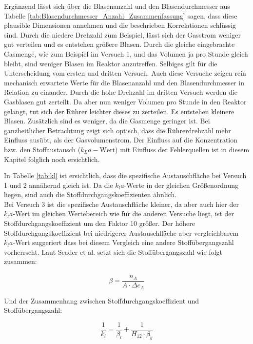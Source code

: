 \documentclass[12pt,liststotoc]{report}
\begin{document}
Ergänzend lässt sich über die Blasenanzahl und den Blasendurchmesser aus Tabelle \ref{tab:Blasendurchmesser_Anzahl_Zusammenfassung} sagen, dass diese plausible Dimensionen annehmen und die beschrieben Korrelationen schlüssig sind. Durch die niedere Drehzahl zum Beispiel, lässt sich der Gasstrom weniger gut verteilen und es entstehen größere Blasen. Durch die gleiche eingebrachte Gasmenge, wie zum Beispiel im Versuch 1, und das Volumen ja pro Stunde gleich bleibt, sind weniger Blasen im Reaktor anzutreffen. Selbiges gilt für die Unterscheidung vom ersten und dritten Versuch. Auch diese Versuche zeigen rein mechanisch erwartete Werte für die Blasenanzahl und den Blasendurchmesser in Relation zu einander. Durch die hohe Drehzahl im dritten Versuch werden die Gasblasen gut zerteilt. Da aber nun weniger Volumen pro Stunde in den Reaktor gelangt, tut sich der Rührer leichter dieses zu zerteilen. Es entstehen kleinere Blasen. Zusätzlich sind es weniger, da die Gasmenge geringer ist. Bei ganzheitlicher Betrachtung zeigt sich optisch, dass die Rührerdrehzahl mehr Einfluss ausübt, als der Gasvolumenstrom. Der Einfluss auf die Konzentration bzw. den Stoffaustausch ($k_La-\text{Wert}$) mit Einfluss der Fehlerquellen ist in diesem Kapitel folglich noch ersichtlich.\newline

In Tabelle \ref{tab:kl} ist ersichtlich, dass die spezifische Austauschfläche bei Versuch 1 und 2 annähernd gleich ist. Da die $k_la$-Werte in der gleichen Größenordnung liegen, sind auch die Stoffdurchgangskoeffizienten ähnlich.\\
Bei Versuch 3 ist die spezifische Austauschfläche kleiner, da aber auch hier der $k_la$-Wert im gleichen Wertebereich wie für die anderen Versuche liegt, ist der Stoffdurchgangskoeffizient um den Faktor 10 größer. Der höhere Stoffdurchgangskoeffizient bei niedrigerer Austauschfläche aber vergleichbarem $k_la$-Wert suggeriert dass bei diesem Vergleich eine andere Stoffübergangszahl vorherrscht.  Laut Seader et al. \cite{seader1998separation} setzt sich die Stoffübergangszahl wie folgt zusammen:

\begin{equation}
    \beta = \frac{\dot{n}_A}{A \cdot \Delta c_A}
\end{equation}

Und der Zusammenhang zwischen Stoffdurchgangskoeffizient und Stoffübergangszahl:

\begin{equation}
    \frac{1}{k_l} = \frac{1}{\beta_l} + \frac{1}{H_{12} \cdot \beta_g}
\end{equation}
\end{document}
